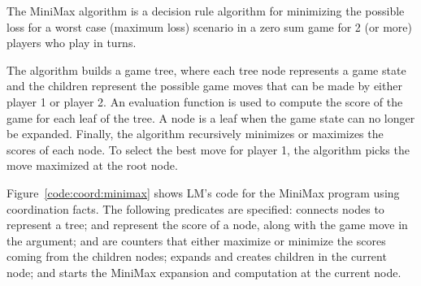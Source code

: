 The MiniMax algorithm is a decision rule algorithm for minimizing the possible
loss for a worst case (maximum loss) scenario in a zero sum game for 2 (or more)
players who play in turns.

The algorithm builds a game tree, where each tree node represents a game state
and the children represent the possible game moves that can be made by either
player 1 or player 2.  An evaluation function is used to compute the score of
the game for each leaf of the tree. A node is a leaf when the game state can no
longer be expanded. Finally, the algorithm recursively minimizes or maximizes
the scores of each node. To select the best move for player 1, the algorithm
picks the move maximized at the root node.

Figure~\ref{code:coord:minimax} shows LM's code for the MiniMax program using
coordination facts. The following predicates are specified: 
connects nodes to represent a tree;  and
 represent the score of a node, along with the
game move in the  argument;  and  are
counters that either maximize or minimize the scores coming from the children
nodes;  expands and creates children in the current node; and
 starts the MiniMax expansion and computation at the current node.

